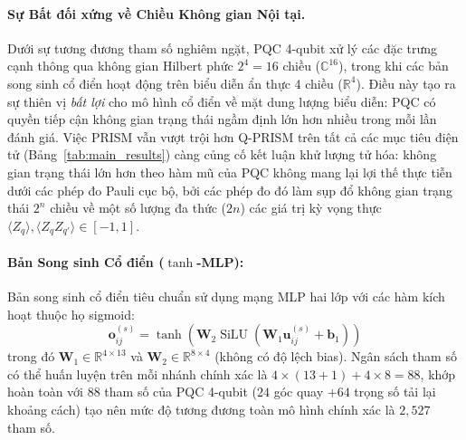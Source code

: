 \documentclass[10pt,twocolumn,letterpaper]{article}
\begin{document}
\paragraph{Sự Bất đối xứng về Chiều Không gian Nội tại.}
Dưới sự tương đương tham số nghiêm ngặt, PQC 4-qubit xử lý các đặc trưng cạnh thông qua không gian Hilbert phức $2^4 = 16$ chiều ($\mathbb{C}^{16}$), trong khi các bản song sinh cổ điển hoạt động trên biểu diễn ẩn thực 4 chiều ($\mathbb{R}^4$). Điều này tạo ra sự thiên vị \textit{bất lợi} cho mô hình cổ điển về mặt dung lượng biểu diễn: PQC có quyền tiếp cận không gian trạng thái ngầm định lớn hơn nhiều trong mỗi lần đánh giá. Việc PRISM vẫn vượt trội hơn Q-PRISM trên tất cả các mục tiêu điện tử (Bảng~\ref{tab:main_results}) càng củng cố kết luận khử lượng tử hóa: không gian trạng thái lớn hơn theo hàm mũ của PQC không mang lại lợi thế thực tiễn dưới các phép đo Pauli cục bộ, bởi các phép đo đó làm sụp đổ không gian trạng thái $2^n$ chiều về một số lượng đa thức ($2n$) các giá trị kỳ vọng thực $\langle Z_q \rangle, \langle Z_q Z_{q'} \rangle \in [-1,1]$.

\paragraph{Bản Song sinh Cổ điển ($\tanh$-MLP):}
Bản song sinh cổ điển tiêu chuẩn sử dụng mạng MLP hai lớp với các hàm kích hoạt thuộc họ sigmoid:
\begin{equation}
    \mathbf{o}_{ij}^{(s)} = \tanh\left(\mathbf{W}_2 \operatorname{SiLU}(\mathbf{W}_1 \mathbf{u}_{ij}^{(s)} + \mathbf{b}_1)\right)
\end{equation}
trong đó $\mathbf{W}_1 \in \mathbb{R}^{4 \times 13}$ và $\mathbf{W}_2 \in \mathbb{R}^{8 \times 4}$ (không có độ lệch bias). Ngân sách tham số có thể huấn luyện trên mỗi nhánh chính xác là $4 \times (13 + 1) + 4 \times 8 = 88$, khớp hoàn toàn với 88 tham số của PQC 4-qubit ($24$ góc quay $+ 64$ trọng số tải lại khoảng cách) tạo nên mức độ tương đương toàn mô hình chính xác là $2{,}527$ tham số.
\end{document}

